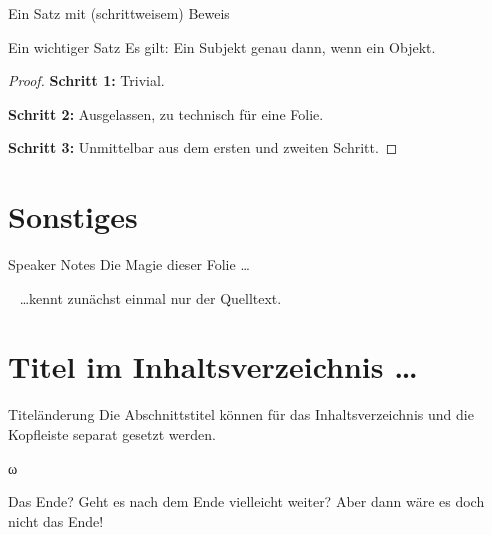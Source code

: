 \begin{frame}{Ein Satz mit (schrittweisem) Beweis}
    \begin{mathblock}{Ein wichtiger Satz}
        Es gilt: Ein Subjekt genau dann, wenn ein Objekt.
    \end{mathblock}
    \pause%
    \begin{proof} \par
        {\bfseries Schritt 1:} Trivial.
        \par\pause%
        {\bfseries Schritt 2:} Ausgelassen, zu technisch für eine Folie.
        \par\pause%
        {\bfseries Schritt 3:} Unmittelbar aus dem ersten und zweiten Schritt.
    \end{proof}
\end{frame}

\section{Sonstiges}

\begin{frame}{Speaker Notes}{}
    Die Magie dieser Folie \ldots
    \par{}~\pause%
    \ldots kennt zunächst einmal nur der Quelltext.
\end{frame}

\section[\ldots Titel in der Kopfleiste]{Titel im Inhaltsverzeichnis \ldots}

\begin{frame}{Titeländerung}{}
    Die Abschnittstitel können für das Inhaltsverzeichnis und die Kopfleiste separat gesetzt werden.
\end{frame}


\begin{standoutframe}
    \begin{center}
        {\color{accentcolor}\fontsize{60}{60}\selectfont ω}
    \end{center}
\end{standoutframe}

\appendix

\begin{frame}{Das Ende?}
    Geht es nach dem Ende vielleicht weiter? Aber dann wäre es doch nicht das Ende!
\end{frame}


